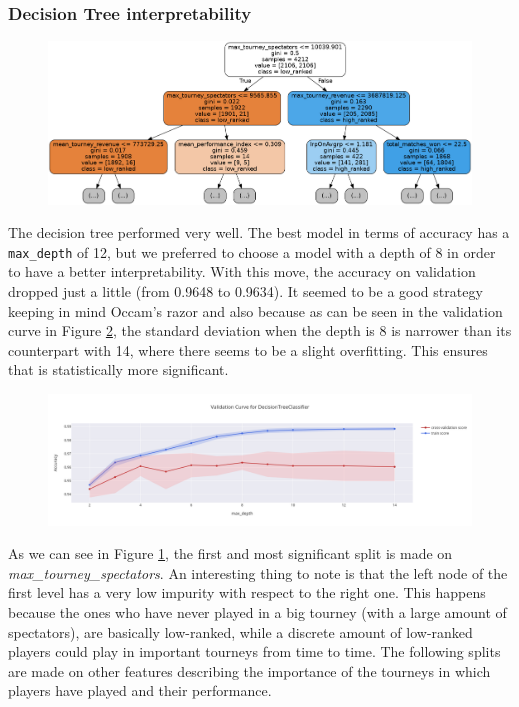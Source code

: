 \subsubsection{Decision Tree interpretability}
\begin{figure}[h!]
	\centering
	\includegraphics[width=\textwidth]{plots/classification/decision_tree_plot.png}
	\label{fig:decision_tree_plot}
\end{figure}
The decision tree performed very well. The best model in terms of accuracy has a \verb|max_depth| of 12, but we preferred to choose a model with a depth of 8 in order to have a better interpretability. With this move, the accuracy on validation dropped just a little (from 0.9648 to 0.9634). It seemed to be a good strategy keeping in mind Occam's razor and also because as can be seen in the validation curve in Figure \ref{fig:decision_tree_curve}, the standard deviation when the depth is 8 is narrower than its counterpart with 14, where there seems to be a slight overfitting. This ensures that is statistically more significant.

\begin{figure}[h!]
	\centering
	\includegraphics[width=\textwidth]{plots/classification/decision_tree_validation_curve.png}
	\label{fig:decision_tree_curve}
\end{figure}


As we can see in Figure \ref{fig:decision_tree_plot}, the first and most significant split is made on \textit{max\_tourney\_spectators}. An interesting thing to note is that the left node of the first level has a very low impurity with respect to the right one. This happens because the ones who have never played in a big tourney (with a large amount of spectators), are basically low-ranked, while a discrete amount of low-ranked players could play in important tourneys from time to time. The following splits are made on other features describing the importance of the tourneys in which players have played and their performance.


